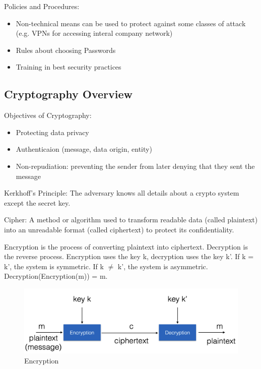 Policies and Procedures:
\begin{itemize}
    \item Non-technical means can be used to protect against some classes of attack (e.g. VPNs for accessing interal company network)
    \item Rules about choosing Passwords
    \item Training in best security practices
\end{itemize}

\subsection{Cryptography Overview}
Objectives of Cryptography:
\begin{itemize}
    \item Protecting data privacy
    \item Authenticaion (message, data origin, entity)
    \item Non-repudiation: preventing the sender from later denying that they sent the message
\end{itemize}

\newpage

\begin{defn}
Kerkhoff's Principle: The adversary knows all details about a crypto system except the secret key.
\end{defn}

\begin{defn}
Cipher: A method or algorithm used to transform readable data (called plaintext) into an unreadable format (called ciphertext) to protect its confidentiality.
\end{defn}

Encryption is the process of converting plaintext into ciphertext. Decryption is the reverse process. Encryption uses the key k, decryption uses the key k'. If k = k', the system is symmetric. If k $\neq$ k', the system is asymmetric. Decryption(Encryption(m)) = m.
\begin{figure}[h!]
    \centering
    \includegraphics[scale=0.5]{img/w1encryption.png}
    \caption{Encryption}
\end{figure}

